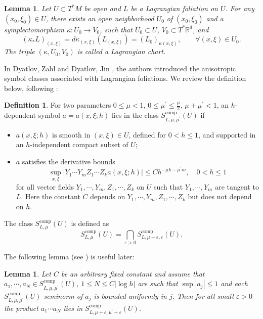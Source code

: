 \documentclass[11pt,oneside,reqno]{amsart}
\newtheorem{lemma}[theorem]{Lemma}
\theoremstyle{definition}
\newtheorem{definition}{Definition}[section]
\numberwithin{equation}{section}
\theoremstyle{plain}
\begin{document}
\begin{lemma}\label{locallagrangian}
 Let $U\subset T^*M$ be open and $L$ be a Lagrangian foliation on $U$. For any $(x_0,\xi_0)\in U$, there exists an open neighborhood $U_0$ of $(x_0,\xi_0)$ and a symplectomorphism $\kappa: U_0 \rightarrow V_0$, such that $U_0 \subset U$, $V_0\subset T^* \mathbb{R}^d$, and
 \begin{equation*}
     (\kappa_{*}L)_{(x,\xi)}=d \kappa_{(x, \xi)} (L_{(x, \xi)})=\left(L_0\right)_{\kappa(x, \xi)}, \qquad \forall(x, \xi) \in U_0.
 \end{equation*}
The triple $(\kappa,U_0,V_0)$ is called a Lagrangian chart.
\end{lemma}
In Dyatlov, Zahl \cite{dyatlovzahl2016spectral} and Dyatlov, Jin \cite{dyatlov2018semiclassical}, the authors introduced the anisotropic symbol classes associated with Lagrangian foliations. We review the definition below, following \cite[(2.16) \& Appendix A.1]{dyatlov2018semiclassical}:

\begin{definition}\label{anisosymbolclass}
For two parameters $0 \leq \mu<1$, $0 \leq \mu^{\prime} \leq \frac{\mu}{2}$, $\mu+\mu^{\prime}<1$, an $h$-dependent symbol $a=a(x,\xi;h)$ lies in the class $S_{L, \mu, \mu^{\prime}}^{\mathrm{comp}}(U)$ if
\begin{itemize}
\item $a(x, \xi ; h)$ is smooth in $(x, \xi) \in U$, defined for $0<h \leq 1$, and supported in an $h$-independent compact subset of $U$;
\item $a$ satisfies the derivative bounds
$$
\sup _{x, \xi}\left|Y_1 \cdots Y_m Z_1 \cdots Z_k a(x, \xi ; h)\right| \leq C h^{-\mu k-\mu^{\prime} m}, \quad 0<h \leq 1
$$
for all vector fields $Y_1, \cdots, Y_m, Z_1, \cdots, Z_k$ on $U$ such that $Y_1, \cdots, Y_m$ are tangent to $L$. Here the constant $C$ depends on $Y_1, \cdots, Y_m, Z_1, \cdots, Z_k$ but does not depend on $h$.
\end{itemize}
The class $S_{L, \mu}^{\text{comp}}(U)$ is defined as
\begin{equation}
S_{L, \mu}^{\text{comp}}(U)=\bigcap_{\varepsilon>0} S_{L, \mu+\varepsilon, \varepsilon}^{\mathrm{comp}}(U).
\end{equation}
\end{definition}


The following lemma (see \cite[Lemma A.1]{dyatlov2018semiclassical}) is useful later:
\begin{lemma}
\label{multiofsymbol}
Let $C$ be an arbitrary fixed constant and assume that $a_1, \cdots, a_N \in S_{L, \mu, \mu^{\prime}}^{\mathrm{comp }}(U)$, $1 \leq N \leq C |\log h|$ are such that $\sup \left|a_j\right| \leq 1$ and each $S_{L, \mu, \mu^{\prime}}^{\mathrm {comp }}(U)$ seminorm of $a_j$ is bounded uniformly in $j$. Then for all small $\varepsilon>0$ the product $a_1 \cdots a_N$ lies in $S_{L, \mu+\varepsilon, \mu^{\prime}+\varepsilon}^{\mathrm{comp}}(U)$.
\end{lemma}
\end{document}

